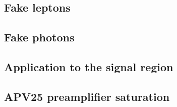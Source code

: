 \subsection{Fake leptons}

\subsection{Fake photons}


\subsection{Application to the signal region}






\begin{subappendices}
  \section{APV25 preamplifier saturation}
  
\end{subappendices}
